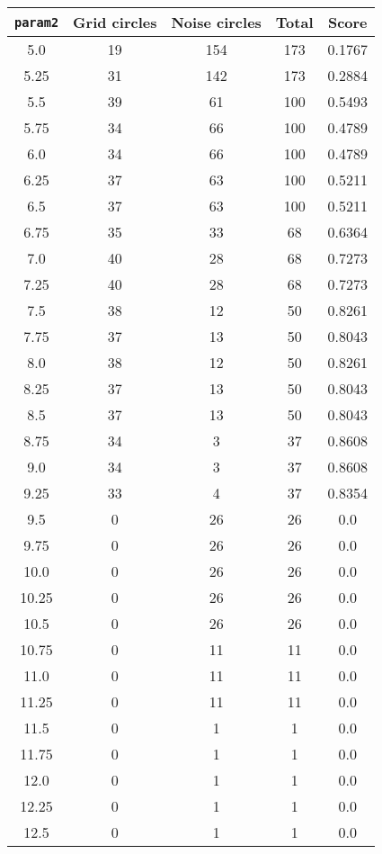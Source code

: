 \documentclass[letterpaper, 12pt]{article}
\begin{document}
\begin{longtable}{|c|c|c|c|c|}
\hline
\textbf{\texttt{param2}} & \textbf{Grid circles} & \textbf{Noise circles} & \textbf{Total} & \textbf{Score} \\
\hline
5.0 & 19 & 154 & 173 & 0.1767 \\
\hline
5.25 & 31 & 142 & 173 & 0.2884 \\
\hline
5.5 & 39 & 61 & 100 & 0.5493 \\
\hline
5.75 & 34 & 66 & 100 & 0.4789 \\
\hline
6.0 & 34 & 66 & 100 & 0.4789 \\
\hline
6.25 & 37 & 63 & 100 & 0.5211 \\
\hline
6.5 & 37 & 63 & 100 & 0.5211 \\
\hline
6.75 & 35 & 33 & 68 & 0.6364 \\
\hline
7.0 & 40 & 28 & 68 & 0.7273 \\
\hline
7.25 & 40 & 28 & 68 & 0.7273 \\
\hline
7.5 & 38 & 12 & 50 & 0.8261 \\
\hline
7.75 & 37 & 13 & 50 & 0.8043 \\
\hline
8.0 & 38 & 12 & 50 & 0.8261 \\
\hline
8.25 & 37 & 13 & 50 & 0.8043 \\
\hline
8.5 & 37 & 13 & 50 & 0.8043 \\
\hline
8.75 & 34 & 3 & 37 & 0.8608 \\
\hline
9.0 & 34 & 3 & 37 & 0.8608 \\
\hline
9.25 & 33 & 4 & 37 & 0.8354 \\
\hline
9.5 & 0 & 26 & 26 & 0.0 \\
\hline
9.75 & 0 & 26 & 26 & 0.0 \\
\hline
10.0 & 0 & 26 & 26 & 0.0 \\
\hline
10.25 & 0 & 26 & 26 & 0.0 \\
\hline
10.5 & 0 & 26 & 26 & 0.0 \\
\hline
10.75 & 0 & 11 & 11 & 0.0 \\
\hline
11.0 & 0 & 11 & 11 & 0.0 \\
\hline
11.25 & 0 & 11 & 11 & 0.0 \\
\hline
11.5 & 0 & 1 & 1 & 0.0 \\
\hline
11.75 & 0 & 1 & 1 & 0.0 \\
\hline
12.0 & 0 & 1 & 1 & 0.0 \\
\hline
12.25 & 0 & 1 & 1 & 0.0 \\
\hline
12.5 & 0 & 1 & 1 & 0.0 \\

\end{longtable}
\end{document}
